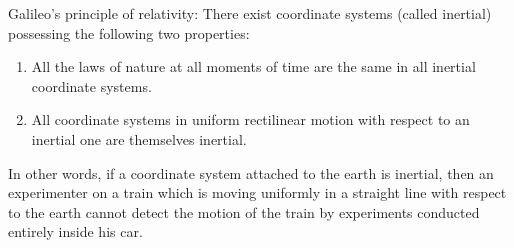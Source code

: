 Galileo's principle of relativity: There exist coordinate systems (called inertial) possessing the following two properties:

\begin{enumerate}
\item All the laws of nature at all moments of time are the same in all inertial coordinate systems.
\item All coordinate systems in uniform rectilinear motion with respect to an inertial one are themselves inertial.
\end{enumerate}

In other words, if a coordinate system attached to the earth is inertial, then an experimenter on a train which is moving uniformly in a straight line with respect to the earth cannot detect the motion of the train by experiments conducted entirely inside his car.
